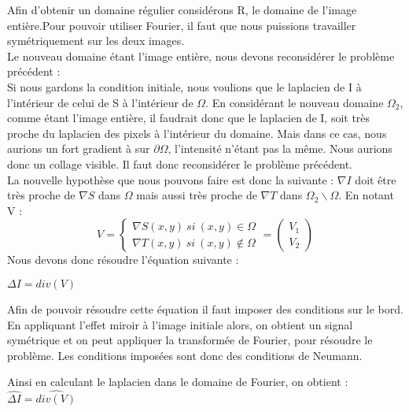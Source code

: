 Afin d'obtenir un domaine régulier considérons R, le domaine de l'image entière.Pour pouvoir utiliser Fourier, il faut que nous puissions travailler symétriquement sur les deux images.\\
Le nouveau domaine étant l'image entière, nous devons reconsidérer le problème précédent :\\
Si nous gardons la condition initiale, nous voulions que le laplacien de I à l'intérieur de celui de S à l'intérieur de $\Omega$. En considérant le nouveau domaine $\Omega_2$, comme étant l'image entière, il faudrait donc que le laplacien de I, soit très proche du laplacien des pixels à l'intérieur du domaine. Mais dans ce cas, nous aurions un fort gradient à sur $\partial \Omega$, l'intensité n'étant pas la même. Nous aurions donc un collage visible. Il faut donc reconsidérer le problème précédent. \\
La nouvelle hypothèse que nous pouvons faire  est donc la suivante : $\nabla I$ doit être très proche de $\nabla S$ dans $\Omega$ mais aussi très proche de $\nabla T$ dans $\Omega_2 \backslash \Omega$. En notant V : 
\begin{equation}
V = 
\left\{
\begin{aligned}
\nabla S(x,y) \ si \ (x,y) \in \Omega\\
\nabla T(x,y) \ si \ (x,y) \notin \Omega
\end{aligned}
\right.
= \begin{pmatrix}
V_1\\
V_2
\end{pmatrix}
\end{equation}
Nous devons donc résoudre l'équation suivante : 
\begin{center}
$ \Delta I = div(V)$
\end{center}
Afin de pouvoir résoudre cette équation il faut imposer des conditions sur le bord. En appliquant l'effet miroir à l'image initiale alors, on obtient un signal symétrique  et on peut appliquer la transformée de Fourier, pour résoudre le problème.  Les conditions imposées sont donc des conditions de Neumann.

Ainsi en calculant le laplacien dans le domaine de Fourier, on obtient  : $\widehat{\Delta I} = \widehat{div(V)}$

